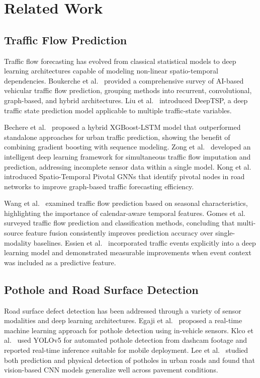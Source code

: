 \documentclass[conference]{IEEEtran}
\begin{document}
\section{Related Work}
\label{sec:related}

\subsection{Traffic Flow Prediction}

Traffic flow forecasting has evolved from classical statistical models to deep learning architectures capable of modeling non-linear spatio-temporal dependencies. Boukerche et al.~\cite{b17} provided a comprehensive survey of AI-based vehicular traffic flow prediction, grouping methods into recurrent, convolutional, graph-based, and hybrid architectures. Liu et al.~\cite{b13} introduced DeepTSP, a deep traffic state prediction model applicable to multiple traffic-state variables.

Bechere et al.~\cite{b1} proposed a hybrid XGBoost-LSTM model that outperformed standalone approaches for urban traffic prediction, showing the benefit of combining gradient boosting with sequence modeling. Zong et al.~\cite{b2} developed an intelligent deep learning framework for simultaneous traffic flow imputation and prediction, addressing incomplete sensor data within a single model. Kong et al.~\cite{b3} introduced Spatio-Temporal Pivotal GNNs that identify pivotal nodes in road networks to improve graph-based traffic forecasting efficiency.

Wang et al.~\cite{b12} examined traffic flow prediction based on seasonal characteristics, highlighting the importance of calendar-aware temporal features. Gomes et al.~\cite{b10} surveyed traffic flow prediction and classification methods, concluding that multi-source feature fusion consistently improves prediction accuracy over single-modality baselines. Essien et al.~\cite{b14} incorporated traffic events explicitly into a deep learning model and demonstrated measurable improvements when event context was included as a predictive feature.

\subsection{Pothole and Road Surface Detection}

Road surface defect detection has been addressed through a variety of sensor modalities and deep learning architectures. Egaji et al.~\cite{b16} proposed a real-time machine learning approach for pothole detection using in-vehicle sensors. Klco et al.~\cite{b11} used YOLOv5 for automated pothole detection from dashcam footage and reported real-time inference suitable for mobile deployment. Lee et al.~\cite{b8} studied both prediction and physical detection of potholes in urban roads and found that vision-based CNN models generalize well across pavement conditions.
\end{document}
